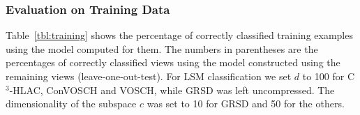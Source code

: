 \documentclass[a4paper, 10 pt, conference]{sty/ieeeconf}
\begin{document}


\subsubsection{Evaluation on Training Data}
Table~\ref{tbl:training} shows the percentage of correctly classified training examples using the model computed for them.
The numbers in parentheses are the percentages of correctly classified views using the model constructed using the remaining views
(leave-one-out-test).
For LSM classification we set $d$ to 
100 for C$^3$-HLAC, ConVOSCH and VOSCH, while GRSD was left uncompressed. 
The dimensionality of the subspace $c$ was set to 10 for GRSD and 50 for the others.

\end{document}
